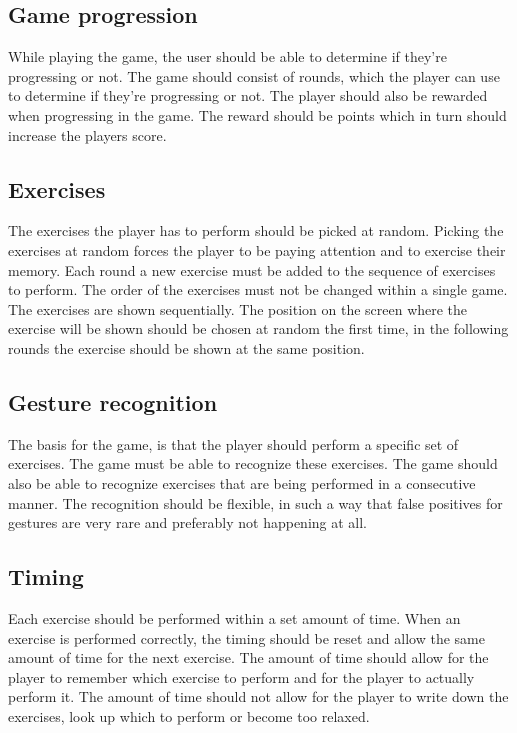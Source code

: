 \documentclass[11pt]{report}
\begin{document}
\subsection{Game progression}
While playing the game, the user should be able to determine if they're progressing or not. The game should consist of rounds, which the player can use to determine if they're progressing or not. The player should also be rewarded when progressing in the game. The reward should be points which in turn should increase the players score.

\subsection{Exercises}
The exercises the player has to perform should be picked at random. Picking the exercises at random forces the player to be paying attention and to exercise their memory. Each round a new exercise must be added to the sequence of exercises to perform. The order of the exercises must not be changed within a single game. The exercises are shown sequentially. The position on the screen where the exercise will be shown should be chosen at random the first time, in the following rounds the exercise should be shown at the same position.

\subsection{Gesture recognition}
The basis for the game, is that the player should perform a specific set of exercises. The game must be able to recognize these exercises. The game should also be able to recognize exercises that are being performed in a consecutive manner. The recognition should be flexible, in such a way that false positives for gestures are very rare and preferably not happening at all.

\subsection{Timing}
Each exercise should be performed within a set amount of time. When an exercise is performed correctly, the timing should be reset and allow the same amount of time for the next exercise. The amount of time should allow for the player to remember which exercise to perform and for the player to actually perform it. The amount of time should not allow for the player to write down the exercises, look up which to perform or become too relaxed.
\end{document}
